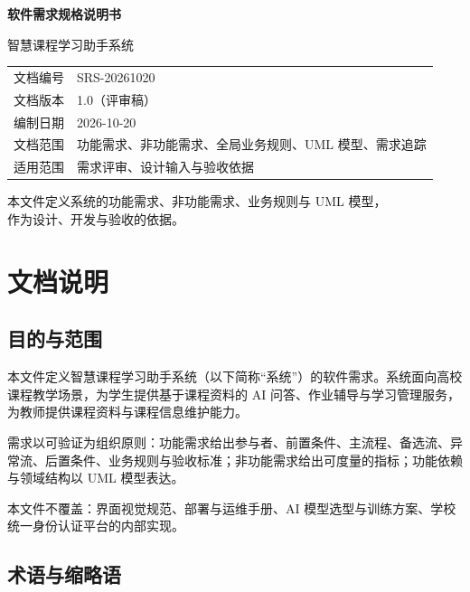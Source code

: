 \documentclass[12pt,a4paper]{ctexart}
\renewcommand{\arraystretch}{1.25}
\begin{document}
\begin{titlepage}
  \centering
  \vspace*{2.2cm}
  {\Huge\bfseries\color{primary} 软件需求规格说明书\par}
  \vspace{0.6cm}
  {\LARGE 智慧课程学习助手系统\par}
  \vspace{2.6cm}

  \renewcommand{\arraystretch}{1.45}
  \begin{tabular}{@{}L{3.2cm}L{8.4cm}@{}}
    \toprule
    文档编号 & SRS-20261020 \\
    文档版本 & 1.0（评审稿） \\
    编制日期 & 2026-10-20 \\
    文档范围 & 功能需求、非功能需求、全局业务规则、UML 模型、需求追踪 \\
    适用范围 & 需求评审、设计输入与验收依据 \\
    \bottomrule
  \end{tabular}

  \vfill
  {\small 本文件定义系统的功能需求、非功能需求、业务规则与 UML 模型，\\
  作为设计、开发与验收的依据。\par}
\end{titlepage}

\tableofcontents
\newpage

\section{文档说明}

\subsection{目的与范围}

本文件定义智慧课程学习助手系统（以下简称“系统”）的软件需求。系统面向高校课程教学场景，为学生提供基于课程资料的 AI 问答、作业辅导与学习管理服务，为教师提供课程资料与课程信息维护能力。

需求以可验证为组织原则：功能需求给出参与者、前置条件、主流程、备选流、异常流、后置条件、业务规则与验收标准；非功能需求给出可度量的指标；功能依赖与领域结构以 UML 模型表达。

本文件不覆盖：界面视觉规范、部署与运维手册、AI 模型选型与训练方案、学校统一身份认证平台的内部实现。

\subsection{术语与缩略语}
\end{document}
